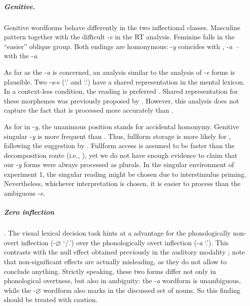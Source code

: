 \documentclass[output=paper, modfonts,newtxmath,hidelinks]{langscibook}
\begin{document}
\subparagraph*{{Genitive.}} Genitive wordforms behave differently in the two inflectional classes. Masculine   pattern together with the difficult -\textit{e} in the RT analysis. Feminine  falls in the “easier” oblique group. Both  endings are homonymous:   -\textit{y} coincides with  ,   -\textit{a}~\--- with the   -\textit{a}. 

As far as the   -\textit{a} is concerned, an analysis similar to the analysis of -\textit{e} forms is plausible. Two -\textit{a}-s (`\genn.\masc' and `\nomm.\fem')
have a shared representation in the mental lexicon. In a context-less condition, the  reading is preferred . Shared representation for these morphemes was previously proposed by \citet{muller2004decomposing, wunderlich2004there}. However, this analysis does not capture the fact that   is processed more accurately than  .

As for   in -\textit{y}, the unanimous position \citep{muller2004decomposing,wunderlich2004there,wiese2004categories} stands for accidental homonymy. Genitive singular -\textit{y} is more frequent than   \citep{samojlova2014frequencies}. Thus, fullform storage is more likely for  , following the suggestion by \citet{bertram2000role}. Fullform access is assumed to be faster than the decomposition route (i.e., \citealt{bertram2000role}), yet we do not have enough evidence to claim that our -\textit{y} forms were always processed as  plurals. In the singular environment of experiment 1, the singular reading might be chosen due to interstimulus priming. Nevertheless, whichever interpretation is chosen, it is easier to process than the ambiguous -\textit{e}.

\subparagraph*{{Zero  inflection}}. The visual lexical decision task hints at a  advantage for the phonologically non-overt inflection (-\textit{$\varnothing$} `{\nomm/\accc.\masc}’) over the phonologically overt inflection (-\textit{a} `{\nomm.\fem}’). This contrasts with the null effect obtained previously in the auditory modality \citep{gor2017processing}; note that non-significant effects are actually misleading, as they do not allow to conclude anything. Strictly speaking, these two forms differ not only in phonological overtness, but also in ambiguity: the -\textit{a} wordform is unambiguous, while the -\textit{$\varnothing$} wordform also marks  in the discussed set of nouns. So this finding should be treated with caution.
\end{document}
